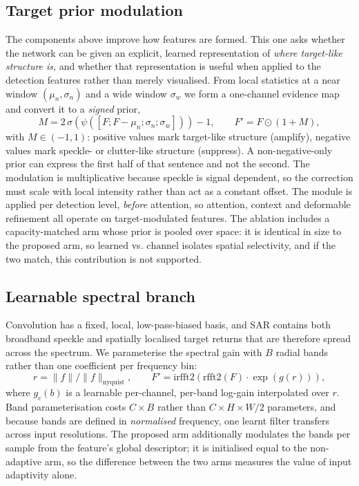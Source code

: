 \documentclass[10pt,twocolumn,letterpaper]{article}
\begin{document}
\subsection{Target prior modulation}
\label{sec:tpm}
The components above improve how features are formed. This one asks whether the
network can be given an explicit, learned representation of \emph{where
target-like structure is}, and whether that representation is useful when
applied to the detection features rather than merely visualised. From local
statistics at a near window $(\mu_n, \sigma_n)$ and a wide window
$\sigma_w$ we form a one-channel evidence map and convert it to a \emph{signed}
prior,
\begin{equation}
M = 2\,\sigma\!\left(\psi([F ; F - \mu_n ; \sigma_n ; \sigma_w])\right) - 1,
\qquad F' = F \odot (1 + M),
\end{equation}
with $M \in (-1, 1)$: positive values mark target-like structure (amplify),
negative values mark speckle- or clutter-like structure (suppress). A
non-negative-only prior can express the first half of that sentence and not the
second. The modulation is multiplicative because speckle is signal dependent, so
the correction must scale with local intensity rather than act as a constant
offset. The module is applied per detection level, \emph{before} attention, so
attention, context and deformable refinement all operate on target-modulated features. The ablation
includes a capacity-matched arm whose prior is pooled over space: it is identical
in size to the proposed arm, so $\mathrm{learned}$ vs. $\mathrm{channel}$ isolates
spatial selectivity, and if the two match, this contribution is not supported.

\subsection{Learnable spectral branch}
\label{sec:sfr}
Convolution has a fixed, local, low-pass-biased basis, and SAR contains both
broadband speckle and spatially localised target returns that are therefore
spread across the spectrum. We parameterise the spectral gain with $B$ radial
bands rather than one coefficient per frequency bin:
\begin{equation}
r = \lVert f \rVert / \lVert f \rVert_{\mathrm{nyquist}}, \qquad
F' = \mathrm{irfft2}\!\left(\mathrm{rfft2}(F) \cdot \exp(g(r))\right),
\end{equation}
where $g_c(b)$ is a learnable per-channel, per-band log-gain interpolated over
$r$. Band parameterisation costs $C \times B$ rather than $C \times H \times W/2$
parameters, and because bands are defined in \emph{normalised} frequency, one
learnt filter transfers across input resolutions. The proposed arm additionally
modulates the bands per sample from the feature's global descriptor; it is
initialised equal to the non-adaptive arm, so the difference between the two arms
measures the value of input adaptivity alone.
\end{document}
